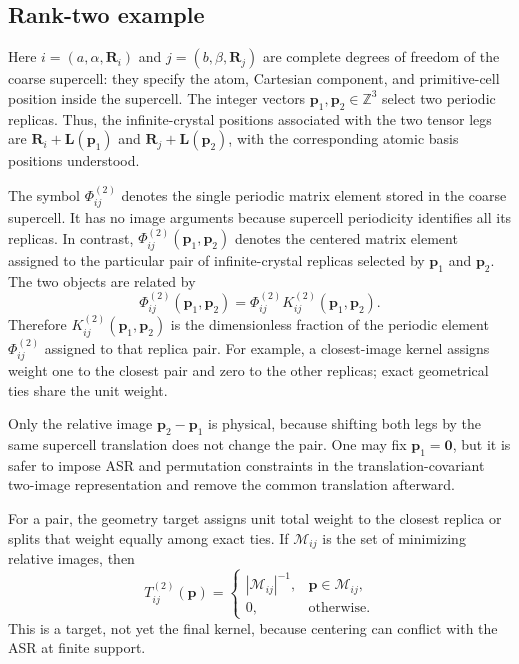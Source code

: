\documentclass{article}
\begin{document}
\subsection{Rank-two example}
\label{sec:rank2}

Here $i=(a,\alpha,\bm R_i)$ and $j=(b,\beta,\bm R_j)$ are complete
degrees of freedom of the coarse supercell: they specify the atom, Cartesian
component, and primitive-cell position inside the supercell. The integer
vectors $\bm p_1,\bm p_2\in\mathbb Z^3$ select two periodic replicas.
Thus, the infinite-crystal positions associated with the two tensor legs
are $\bm R_i+\bm L(\bm p_1)$ and
$\bm R_j+\bm L(\bm p_2)$, with the corresponding atomic basis positions
understood.

The symbol $\Phi^{(2)}_{ij}$ denotes the single periodic matrix element
stored in the coarse supercell. It has no image arguments because
supercell periodicity identifies all its replicas. In contrast,
$\varPhi^{(2)}_{ij}(\bm p_1,\bm p_2)$ denotes the centered matrix element
assigned to the particular pair of infinite-crystal replicas selected by
$\bm p_1$ and $\bm p_2$. The two objects are related by
\begin{equation}
    \varPhi^{(2)}_{ij}(\bm p_1,\bm p_2)
    =
    \Phi^{(2)}_{ij}
    K^{(2)}_{ij}(\bm p_1,\bm p_2).
    \label{eq:rank2-extension}
\end{equation}
Therefore $K^{(2)}_{ij}(\bm p_1,\bm p_2)$ is the dimensionless fraction of
the periodic element $\Phi^{(2)}_{ij}$ assigned to that replica pair. For
example, a closest-image kernel assigns weight one to the closest pair and
zero to the other replicas; exact geometrical ties share the unit weight.

Only the relative image $\bm p_2-\bm p_1$ is physical, because shifting
both legs by the same supercell translation does not change the pair. One
may fix $\bm p_1=\bm 0$, but it is safer to impose ASR and permutation
constraints in the translation-covariant two-image representation and
remove the common translation afterward.

For a pair, the geometry target assigns unit total weight to the closest
replica or splits that weight equally among exact ties. If
$\mathcal M_{ij}$ is the set of minimizing relative images, then
\begin{equation}
    T^{(2)}_{ij}(\bm p)
    =
    \begin{cases}
    |\mathcal M_{ij}|^{-1}, & \bm p\in\mathcal M_{ij},\\
    0, & \text{otherwise}.
    \end{cases}
    \label{eq:rank2-target}
\end{equation}
This is a target, not yet the final kernel, because centering can conflict
with the ASR at finite support.
\end{document}
